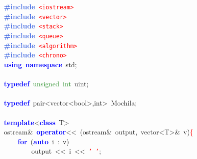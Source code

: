 \noindent
\mbox{}\textbf{\textcolor{RoyalBlue}{\#include}}\ \texttt{\textcolor{Red}{\textless{}iostream\textgreater{}}} \\
\mbox{}\textbf{\textcolor{RoyalBlue}{\#include}}\ \texttt{\textcolor{Red}{\textless{}vector\textgreater{}}} \\
\mbox{}\textbf{\textcolor{RoyalBlue}{\#include}}\ \texttt{\textcolor{Red}{\textless{}stack\textgreater{}}} \\
\mbox{}\textbf{\textcolor{RoyalBlue}{\#include}}\ \texttt{\textcolor{Red}{\textless{}queue\textgreater{}}} \\
\mbox{}\textbf{\textcolor{RoyalBlue}{\#include}}\ \texttt{\textcolor{Red}{\textless{}algorithm\textgreater{}}} \\
\mbox{}\textbf{\textcolor{RoyalBlue}{\#include}}\ \texttt{\textcolor{Red}{\textless{}chrono\textgreater{}}} \\
\mbox{}\textbf{\textcolor{Blue}{using}}\ \textbf{\textcolor{Blue}{namespace}}\ std\textcolor{BrickRed}{;} \\
\mbox{} \\
\mbox{}\textbf{\textcolor{Blue}{typedef}}\ \textcolor{ForestGreen}{unsigned}\ \textcolor{ForestGreen}{int}\ uint\textcolor{BrickRed}{;} \\
\mbox{} \\
\mbox{}\textbf{\textcolor{Blue}{typedef}}\ \textcolor{TealBlue}{pair\textless{}vector\textless{}bool\textgreater{},int\textgreater{}}\ Mochila\textcolor{BrickRed}{;} \\
\mbox{} \\
\mbox{}\textbf{\textcolor{Blue}{template}}\textcolor{BrickRed}{\textless{}}\textbf{\textcolor{Blue}{class}}\ \textcolor{TealBlue}{T}\textcolor{BrickRed}{\textgreater{}} \\
\mbox{}ostream\textcolor{BrickRed}{\&}\ \textbf{\textcolor{Blue}{operator}}\textcolor{BrickRed}{\textless{}\textless{}}\ \textcolor{BrickRed}{(}ostream\textcolor{BrickRed}{\&}\ output\textcolor{BrickRed}{,}\ vector\textcolor{BrickRed}{\textless{}}T\textcolor{BrickRed}{\textgreater{}\&}\ v\textcolor{BrickRed}{)}\textcolor{Red}{\{} \\
\mbox{}\ \ \ \ \textbf{\textcolor{Blue}{for}}\ \textcolor{BrickRed}{(}\textbf{\textcolor{Blue}{auto}}\ i\ \textcolor{BrickRed}{:}\ v\textcolor{BrickRed}{)} \\
\mbox{}\ \ \ \ \ \ \ \ output\ \textcolor{BrickRed}{\textless{}\textless{}}\ i\ \textcolor{BrickRed}{\textless{}\textless{}}\ \texttt{\textcolor{Red}{'\ '}}\textcolor{BrickRed}{;} \\
